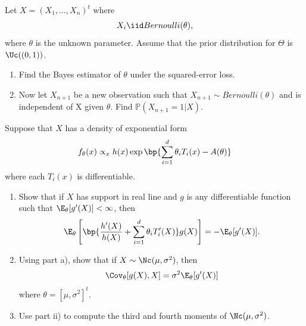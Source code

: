 \documentclass{article}
\begin{document}
\MakeAssignmentTitle

\begin{homeworkProblem}

  Let $X = (X_1, \dots, X_n)^t$ where
  \[
    X_i \iid Bernoulli(\theta),
  \]
  where $\theta$ is the unknown parameter. Assume that the prior distribution for $\Theta$ is $\Uc((0, 1))$.
  \begin{enumerate}[label=(\roman*), topsep=5pt, itemsep=5pt]
    \item Find the Bayes estimator of $\theta$ under the squared-error loss.
    \item Now let $X_{n+1}$ be a new observation such that $X_{n+1} \sim Bernoulli(\theta)$ and is
          independent of X given $\theta$. Find $\mathbb{P}(X_{n+1} = 1|X)$. \newline
  \end{enumerate}

  \solution


\end{homeworkProblem}

\pagebreak

\begin{homeworkProblem}

  Suppose that $X$ has a density of exponential form
  \[
    f_\theta(x) \propto_{x} h(x) \exp \bp{\sum_{i=1}^{d} \theta_i T_i(x) - A(\theta)}
  \]
  where each $T_i(x)$ is differentiable.

  \begin{enumerate}[label=(\roman*), topsep=5pt, itemsep=5pt]
    \item Show that if $X$ has support in real line and $g$ is any differentiable function such that $\E_\theta[g^{\prime}(X)] < \infty$, then
          \[
            \E_\theta \left[ \bp{\frac{h^{\prime}(X)}{h(X)} + \sum_{i=1}^{d} \theta_i T_i^{\prime}(X)} g(X) \right] = - \E_\theta[g^{\prime}(X)].
          \]
    \item Using part a), show that if $X \sim \Nc(\mu, \sigma^2)$, then
          \[
            \Cov_\theta[g(X), X] = \sigma^2 \E_\theta[g^{\prime} (X)]
          \]
          where $\theta = [\mu, \sigma^2]^t$.
    \item Use part ii) to compute the third and fourth moments of $\Nc(\mu, \sigma^2)$. \newline
  \end{enumerate}

  \solution

\end{homeworkProblem}
\end{document}

